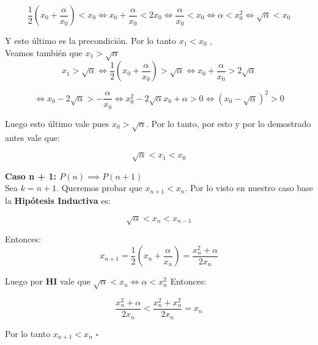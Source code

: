 \begin{displaymath}
    \frac{1}{2}(x_0 + \frac{\alpha}{x_0}) < x_0 \iff x_0 + \frac{\alpha}{x_0} < 2x_0 \iff \frac{\alpha}{x_0} < x_0 \iff \alpha < x_0^2 \iff \sqrt{\alpha} < x_0
\end{displaymath}

Y esto último es la precondición. Por lo tanto $x_1 < x_0$ $_\square$\\

Veamos también que $x_1 > \sqrt{\alpha}$\\

\begin{displaymath}
    x_1 > \sqrt{\alpha} \iff \frac{1}{2}(x_0 + \frac{\alpha}{x_0}) > \sqrt{\alpha} \iff x_0 + \frac{\alpha}{x_0} > 2\sqrt{\alpha}
\end{displaymath}

\begin{displaymath}
    \iff x_0 - 2\sqrt{\alpha} > -\frac{\alpha}{x_0} \iff x_0^2 - 2\sqrt{\alpha}x_0 + \alpha > 0 \iff (x_0 - \sqrt{\alpha})^2 > 0
\end{displaymath}

Luego esto último vale pues $x_0 > \sqrt{\alpha}$. Por lo tanto, por esto y por lo demostrado antes vale que:

\begin{displaymath}
    \sqrt{\alpha} < x_1 < x_0
\end{displaymath}

{\bf Caso n + 1: $P(n) \implies P(n + 1)$}\\
Sea $k = n + 1$. Queremos probar que $x_{n + 1} < x_n$. Por lo visto en nuestro caso base la {\bf Hipótesis Inductiva} es:

\begin{displaymath}
    \sqrt{\alpha} < x_n < x_{n - 1}
\end{displaymath}

Entonces:
\begin{displaymath}
    x_{n + 1} = \frac{1}{2}(x_n + \frac{\alpha}{x_n}) = \frac{x_n^2 + \alpha}{2x_n}
\end{displaymath}

Luego por {\bf HI} vale que $\sqrt{\alpha} < x_n \iff \alpha < x_n^2 $ Entonces:

\begin{displaymath}
    \frac{x_n^2 + \alpha}{2x_n} < \frac{x_n^2 + x_n^2}{2x_n} = x_n
\end{displaymath}

Por lo tanto $x_{n + 1} < x_n$ $\square$
